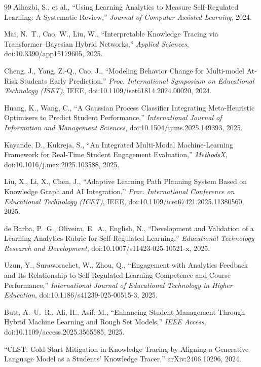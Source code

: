 \documentclass[12pt]{report}
\begin{document}
\begin{thebibliography}{99}
 Alhazbi, S., et al., ``Using Learning Analytics to Measure Self-Regulated Learning: A Systematic Review,'' \textit{Journal of Computer Assisted Learning}, 2024.

 Mai, N.~T., Cao, W., Liu, W., ``Interpretable Knowledge Tracing via Transformer--Bayesian Hybrid Networks,'' \textit{Applied Sciences}, doi:10.3390/app15179605, 2025.

 Cheng, J., Yang, Z.-Q., Cao, J., ``Modeling Behavior Change for Multi-model At-Risk Students Early Prediction,'' \textit{Proc. International Symposium on Educational Technology (ISET)}, IEEE, doi:10.1109/iset61814.2024.00020, 2024.

 Huang, K., Wang, C., ``A Gaussian Process Classifier Integrating Meta-Heuristic Optimisers to Predict Student Performance,'' \textit{International Journal of Information and Management Sciences}, doi:10.1504/ijims.2025.149393, 2025.

 Kayande, D., Kukreja, S., ``An Integrated Multi-Modal Machine-Learning Framework for Real-Time Student Engagement Evaluation,'' \textit{MethodsX}, doi:10.1016/j.mex.2025.103588, 2025.

 Liu, X., Li, X., Chen, J., ``Adaptive Learning Path Planning System Based on Knowledge Graph and AI Integration,'' \textit{Proc. International Conference on Educational Technology (ICET)}, IEEE, doi:10.1109/icet67421.2025.11380560, 2025.

 de Barba, P.~G., Oliveira, E.~A., English, N., ``Development and Validation of a Learning Analytics Rubric for Self-Regulated Learning,'' \textit{Educational Technology Research and Development}, doi:10.1007/s11423-025-10521-x, 2025.

 Uzun, Y., Suraworachet, W., Zhou, Q., ``Engagement with Analytics Feedback and Its Relationship to Self-Regulated Learning Competence and Course Performance,'' \textit{International Journal of Educational Technology in Higher Education}, doi:10.1186/s41239-025-00515-3, 2025.

 Butt, A.~U.~R., Ali, H., Asif, M., ``Enhancing Student Management Through Hybrid Machine Learning and Rough Set Models,'' \textit{IEEE Access}, doi:10.1109/access.2025.3565585, 2025.

 ``CLST: Cold-Start Mitigation in Knowledge Tracing by Aligning a Generative Language Model as a Students' Knowledge Tracer,'' arXiv:2406.10296, 2024.


\end{thebibliography}
\end{document}
